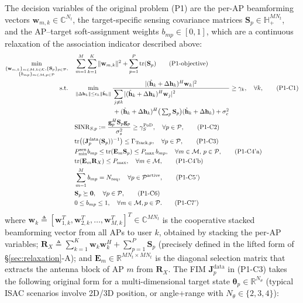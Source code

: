 \documentclass[12pt,a4paper]{article}
\newcommand{\vect}[1]{\mathbf{#1}}
\newcommand{\mat}[1]{\mathbf{#1}}
\newcommand{\tr}{\text{tr}}
\begin{document}
The decision variables of the original problem (P1) are the per-AP beamforming vectors $\vect{w}_{m,k} \in \mathbb{C}^{N_t}$, the target-specific sensing covariance matrices $\mat{S}_p\in\mathbb{H}_+^{MN_t}$, and the AP--target soft-assignment weights $b_{mp}\in[0,1]$, which are a continuous relaxation of the association indicator described above:
\begin{align}
\min_{\substack{\{\vect{w}_{m,k}\}_{m \in \mathcal{M}, k \in \mathcal{K}}, \{\mat{S}_p\}_{p \in \mathcal{P}}, \\ \{b_{mp}\}_{m \in \mathcal{M}, p \in \mathcal{P}}}} \quad
& \sum_{m=1}^{M} \sum_{k=1}^{K} \|\vect{w}_{m,k}\|^2 + \sum_{p=1}^{P} \tr(\mat{S}_p) \tag{P1-objective} \\
\text{s.t.} \quad
& \min_{\|\Delta\vect{h}_k\| \leq \epsilon_h \|\hat{\vect{h}}_k\|}
\frac{|(\hat{\vect{h}}_k + \Delta\vect{h}_k)^H \vect{w}_k|^2}
{\begin{aligned}
&\sum_{j \neq k} |(\hat{\vect{h}}_k + \Delta\vect{h}_k)^H \vect{w}_j|^2 \\
&+ (\hat{\vect{h}}_k + \Delta\vect{h}_k)^H
\big(\textstyle\sum_p \mat{S}_p\big)(\hat{\vect{h}}_k + \Delta\vect{h}_k) + \sigma_c^2
\end{aligned}}
\geq \gamma_k, \quad \forall k, \tag{P1-C1} \\
& \text{SINR}_{S,p} := \frac{\vect{g}_p^H \mat{S}_p \vect{g}_p}{\sigma_s^2} \geq \gamma_S^{\text{PoD}}, \quad \forall p \in \mathcal{P}, \tag{P1-C2} \\
& \tr\big((\mat{J}_p^{\text{data}}(\mat{S}_p))^{-1}\big) \leq \Gamma_{\text{Track}, p}, \quad \forall p \in \mathcal{P}, \tag{P1-C3} \\
& P_{\min}^{\rm sen}b_{mp}\leq\tr(\mat{E}_m \mat{S}_p) \leq P_{\max} \, b_{mp}, \quad \forall m \in \mathcal{M}, \, p \in \mathcal{P}, \tag{P1-C4'a} \label{eq:p1c4a} \\
& \tr(\mat{E}_m \mat{R}_X) \leq P_{\max}, \quad \forall m \in \mathcal{M}, \tag{P1-C4'b} \label{eq:p1c4b} \\
& \sum_{m=1}^{M} b_{mp} = N_{\text{req}}, \quad \forall p \in \mathcal{P}^{\text{active}}, \tag{P1-C5'} \\
& \mat{S}_p \succeq \mat{0}, \quad \forall p \in \mathcal{P}, \tag{P1-C6} \\
& 0 \leq b_{mp} \leq 1, \quad \forall m \in \mathcal{M}, p \in \mathcal{P}. \tag{P1-C7'}
\end{align}
where $\vect{w}_k \triangleq [\vect{w}_{1,k}^T, \vect{w}_{2,k}^T, \ldots, \vect{w}_{M,k}^T]^T \in \mathbb{C}^{MN_t}$ is the cooperative stacked beamforming vector from all APs to user $k$, obtained by stacking the per-AP variables; $\mat{R}_X \triangleq \sum_{k=1}^{K} \vect{w}_k \vect{w}_k^H + \sum_{p=1}^{P} \mat{S}_p$ (precisely defined in the lifted form of \S\ref{sec:relaxation}-A); and $\mat{E}_m \in \mathbb{R}^{MN_t \times MN_t}$ is the diagonal selection matrix that extracts the antenna block of AP $m$ from $\mat{R}_X$. The FIM $\mat{J}_p^{\text{data}}$ in (P1-C3) takes the following original form for a multi-dimensional target state $\boldsymbol{\theta}_p \in \mathbb{R}^{N_\theta}$ (typical ISAC scenarios involve 2D/3D position, or angle+range with $N_\theta \in \{2, 3, 4\}$):
\end{document}

